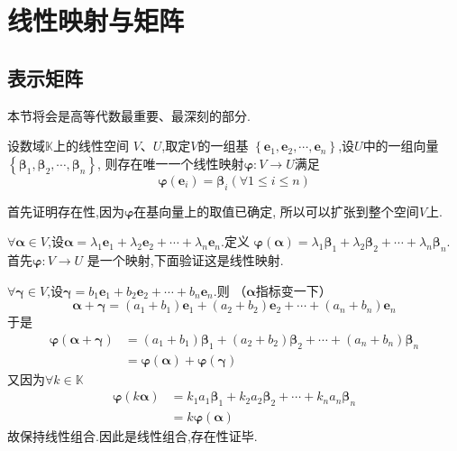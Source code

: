 \section{线性映射与矩阵}
\subsection{表示矩阵}
\begin{red}
\begin{remark}
    本节将会是高等代数最重要、最深刻的部分.
\end{remark}
\end{red}
\begin{green}
\begin{lemma}[线性扩张定理]\label{lemma:线性扩张定理}
    设数域$\mathbb{K}$上的线性空间
    $V$、$U$,取定$V$的一组基
    $\left\{\bm{e}_1,\bm{e}_2,\cdots,
    \bm{e}_n\right\}$,设$U$中的一组向量
    $\left\{\bm{\beta}_1,\bm{\beta}_2,\cdots
    ,\bm{\beta}_n\right\}$,
    则存在唯一一个线性映射$\bm{\varphi}:
    V\longrightarrow U$满足
    \[
    \bm{\varphi}\left(
        \bm{e}_i
    \right)=\bm{\beta}_i\left(
        \forall
         1\leqslant i\leqslant n
    \right)
    \]
\end{lemma}
\begin{Proof}
首先证明存在性,因为$\bm{\varphi}$在基向量上的取值已确定,
所以可以扩张到整个空间$V$上.

$\forall \bm{\alpha}\in V$,设$\bm{\alpha}=\lambda_1\bm{e}_1
+\lambda_2\bm{e}_2+\cdots+\lambda_n\bm{e}_n.$定义
$\bm{\varphi}\left(\bm{\alpha}\right)=
\lambda_1\bm{\beta}_1
+\lambda_2\bm{\beta}_2+\cdots+
\lambda_n\bm{\beta}_n
$.首先$\bm{\varphi}:V\longrightarrow U$
是一个映射,下面验证这是线性映射.

$\forall \bm{\gamma}\in V$,设$\bm{\gamma}=
b_1\bm{e}_1+b_2\bm{e}_2+\cdots+b_n\bm{e}_n.$则
（$\bm{\alpha}$指标变一下）
\[
\bm{\alpha}+\bm{\gamma}=
\left(a_1+b_1\right)
\bm{e}_1+\left(a_2+b_2\right)
\bm{e}_2+\cdots+\left(a_n+b_n
\right)\bm{e}_n
\]
于是\begin{align*}
    \bm{\varphi}
\left(\bm{\alpha}+\bm{\gamma}\right)&=
\left(a_1+b_1\right)
\bm{\beta}_1+\left(a_2+b_2\right)
\bm{\beta}_2+\cdots+\left(a_n+b_n
\right)\bm{\beta}_n\\
&=\bm{\varphi}\left(\bm{\alpha}\right)+\bm{\varphi}\left(\bm{\gamma}\right)
\end{align*}
又因为$\forall k\in \mathbb{K}$
\begin{align*}
   \bm{\varphi}\left(k\bm{\alpha}\right)
&=k_1a_1\bm{\beta}_1+k_2a_2\bm{\beta}_2+\cdots+
k_na_n\bm{\beta}_n
 \\
 &=
 k\bm{\varphi}\left(\bm{\alpha}\right)
\end{align*}
故保持线性组合.因此是线性组合,存在性证毕.


\end{Proof}
\end{green}
